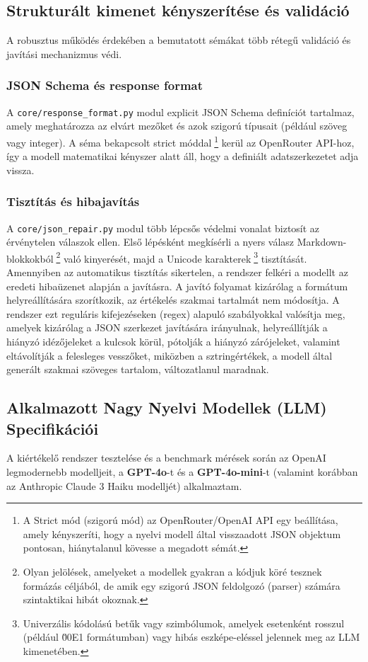 \documentclass[12pt,a4paper]{article}
\begin{document}
\subsection{Strukturált kimenet kényszerítése és validáció}
\label{sec:kenyszerites}
A robusztus működés érdekében a bemutatott sémákat több rétegű validáció és javítási mechanizmus védi.

\subsubsection*{JSON Schema és response format}
A \texttt{core/response\_format.py} modul explicit JSON Schema definíciót tartalmaz, amely meghatározza az elvárt mezőket és azok szigorú típusait (például szöveg vagy integer). A séma bekapcsolt strict móddal\footnote{A Strict mód (szigorú mód) az OpenRouter/OpenAI API egy beállítása, amely kényszeríti, hogy a nyelvi modell által visszaadott JSON objektum pontosan, hiánytalanul kövesse a megadott sémát.} kerül az OpenRouter API-hoz, így a modell matematikai kényszer alatt áll, hogy a definiált adatszerkezetet adja vissza.

\subsubsection*{Tisztítás és hibajavítás}
A \texttt{core/json\_repair.py} modul több lépcsős védelmi vonalat biztosít az érvénytelen válaszok ellen. Első lépésként megkísérli a nyers válasz Markdown-blokkokból\footnote{Olyan jelölések, amelyeket a modellek gyakran a kódjuk köré tesznek formázás céljából, de amik egy szigorú JSON feldolgozó (parser) számára szintaktikai hibát okoznak.} való kinyerését, majd a Unicode karakterek\footnote{Univerzális kódolású betűk vagy szimbólumok, amelyek esetenként rosszul (például \u00E1 formátumban) vagy hibás eszképe-eléssel jelennek meg az LLM kimenetében.} tisztítását. Amennyiben az automatikus tisztítás sikertelen, a rendszer felkéri a modellt az eredeti hibaüzenet alapján a javításra. A javító folyamat kizárólag a formátum helyreállítására szorítkozik, az értékelés szakmai tartalmát nem módosítja. A rendszer ezt reguláris kifejezéseken (regex) alapuló szabályokkal valósítja meg, amelyek kizárólag a JSON szerkezet javítására irányulnak, helyreállítják a hiányzó idézőjeleket a kulcsok körül, pótolják a hiányzó zárójeleket, valamint eltávolítják a felesleges vesszőket, miközben a sztringértékek,  a modell által generált szakmai szöveges tartalom, változatlanul maradnak.

\subsection{Alkalmazott Nagy Nyelvi Modellek (LLM) Specifikációi}
A kiértékelő rendszer tesztelése és a benchmark mérések során az OpenAI legmodernebb modelljeit, a \textbf{GPT-4o}-t és a \textbf{GPT-4o-mini}-t (valamint korábban az Anthropic Claude 3 Haiku modelljét) alkalmaztam. 
\end{document}
